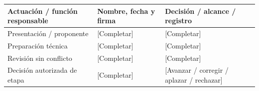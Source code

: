 {\sffamily\fontsize{8.3}{10.3}\selectfont\begin{longtable}{@{}P{51.14mm} P{56.09mm} P{57.74mm}@{}}
\toprule
\textbf{Actuación / función responsable} & \textbf{Nombre, fecha y firma} & \textbf{Decisión / alcance / registro}\\\midrule\endhead
\rule{0pt}{7.7mm}Presentación / proponente & [Completar] & [Completar]\\\hline
\rule{0pt}{7.7mm}Preparación técnica & [Completar] & [Completar]\\\hline
\rule{0pt}{7.7mm}Revisión sin conflicto & [Completar] & [Completar]\\\hline
\rule{0pt}{7.7mm}Decisión autorizada de etapa & [Completar] & [Avanzar / corregir / aplazar / rechazar]\\\hline
\end{longtable}}

